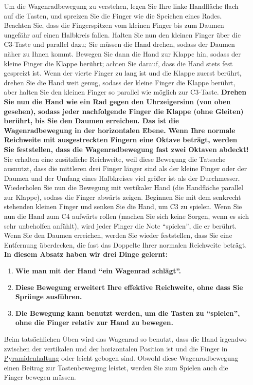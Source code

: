 Um die Wagenradbewegung zu verstehen, legen Sie Ihre linke Handfläche flach auf die Tasten, und spreizen Sie die Finger wie die Speichen eines Rades.
Beachten Sie, dass die Fingerspitzen vom kleinen Finger bis zum Daumen ungefähr auf einen Halbkreis fallen.
Halten Sie nun den kleinen Finger über die C3-Taste und parallel dazu; Sie müssen die Hand drehen, sodass der Daumen näher zu Ihnen kommt.
Bewegen Sie dann die Hand zur Klappe hin, sodass der kleine Finger die Klappe berührt; achten Sie darauf, dass die Hand stets fest gespreizt ist.
Wenn der vierte Finger zu lang ist und die Klappe zuerst berührt, drehen Sie die Hand weit genug, sodass der kleine Finger die Klappe berührt, aber halten Sie den kleinen Finger so parallel wie möglich zur C3-Taste.
\textbf{Drehen Sie nun die Hand wie ein Rad gegen den Uhrzeigersinn (von oben gesehen), sodass jeder nachfolgende Finger die Klappe (ohne Gleiten) berührt, bis Sie den Daumen erreichen.
Das ist die Wagenradbewegung in der horizontalen Ebene.
Wenn Ihre normale Reichweite mit ausgestreckten Fingern eine Oktave beträgt, werden Sie feststellen, dass die Wagenradbewegung fast zwei Oktaven abdeckt!}
Sie erhalten eine zusätzliche Reichweite, weil diese Bewegung die Tatsache ausnutzt, dass die mittleren drei Finger länger sind als der kleine Finger oder der Daumen und der Umfang eines Halbkreises viel größer ist als der Durchmesser.
Wiederholen Sie nun die Bewegung mit vertikaler Hand (die Handfläche parallel zur Klappe), sodass die Finger abwärts zeigen.
Beginnen Sie mit dem senkrecht stehenden kleinen Finger und senken Sie die Hand, um C3 zu spielen.
Wenn Sie nun die Hand zum C4 aufwärts rollen (machen Sie sich keine Sorgen, wenn es sich sehr unbeholfen anfühlt), wird jeder Finger die Note \enquote{spielen}, die er berührt.
Wenn Sie den Daumen erreichen, werden Sie wieder feststellen, dass Sie eine Entfernung überdecken, die fast das Doppelte Ihrer normalen Reichweite beträgt.
\textbf{In diesem Absatz haben wir drei Dinge gelernt:}

\begin{enumerate} 
 \item \textbf{Wie man mit der Hand \enquote{ein Wagenrad schlägt}.}
 \item \textbf{Diese Bewegung erweitert Ihre effektive Reichweite, ohne dass Sie Sprünge ausführen.}
 \item \textbf{Die Bewegung kann benutzt werden, um die Tasten zu \enquote{spielen}, ohne die Finger relativ zur Hand zu bewegen.}
\end{enumerate}
Beim tatsächlichen Üben wird das Wagenrad so benutzt, dass die Hand irgendwo zwischen der vertikalen und der horizontalen Position ist und die Finger in \hyperref[c1iii4b]{Pyramidenhaltung} oder leicht gebogen sind.
Obwohl diese Wagenradbewegung einen Beitrag zur Tastenbewegung leistet, werden Sie zum Spielen auch die Finger bewegen müssen.

